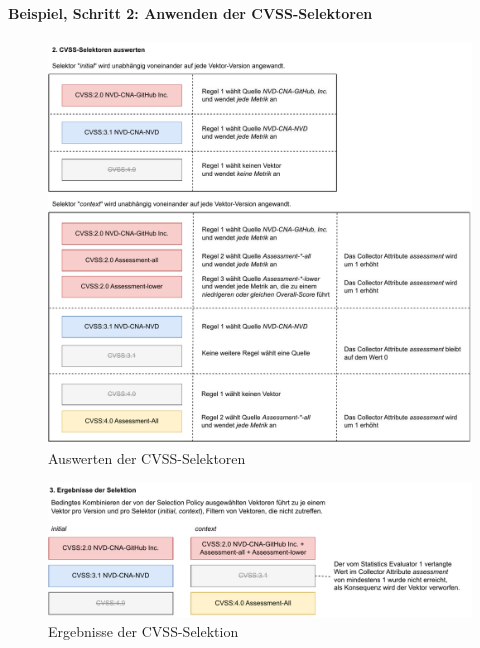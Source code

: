 \paragraph{Beispiel, Schritt 2: Anwenden der CVSS-Selektoren} \label{par:projektbericht-loesungsweg-cvss-selection-example-step-2}

\begin{figure}[htbp] %
    \centering
    \includegraphics[width=1\textwidth, keepaspectratio]{res/grafiken/cvss-selection-process-selection-2}
    \caption{Auswerten der CVSS-Selektoren}
    \label{fig:cvss-selection-process-selection-2}
\end{figure}

\begin{figure}[htbp] %
    \centering
    \includegraphics[width=1\textwidth, keepaspectratio]{res/grafiken/cvss-selection-process-selection-3}
    \caption{Ergebnisse der CVSS-Selektion}
    \label{fig:cvss-selection-process-selection-3}
\end{figure}

